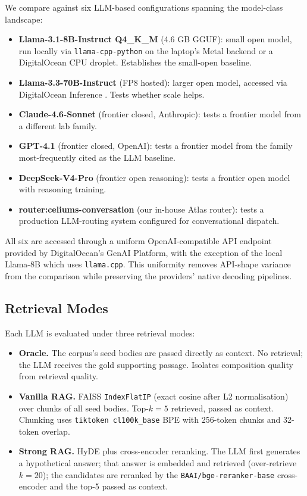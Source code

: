 We compare \hyphae{} against six LLM-based configurations
spanning the model-class landscape:

\begin{itemize}
    \item \textbf{Llama-3.1-8B-Instruct Q4\_K\_M} (4.6 GB GGUF):
    small open model, run locally via
    \texttt{llama-cpp-python} on the laptop's Metal backend or a
    DigitalOcean CPU droplet. Establishes the small-open
    baseline.
    \item \textbf{Llama-3.3-70B-Instruct} (FP8 hosted): larger
    open model, accessed via DigitalOcean Inference
    \citep{do_inference}. Tests whether scale helps.
    \item \textbf{Claude-4.6-Sonnet} (frontier closed,
    Anthropic): tests a frontier model from a different lab
    family.
    \item \textbf{GPT-4.1} (frontier closed, OpenAI): tests a
    frontier model from the family most-frequently cited as the
    LLM baseline.
    \item \textbf{DeepSeek-V4-Pro} (frontier open reasoning):
    tests a frontier open model with reasoning training.
    \item \textbf{router:celiums-conversation} (our in-house
    Atlas router): tests a production LLM-routing system
    configured for conversational dispatch.
\end{itemize}

All six are accessed through a uniform OpenAI-compatible API
endpoint provided by DigitalOcean's GenAI Platform, with the
exception of the local Llama-8B which uses \texttt{llama.cpp}.
This uniformity removes API-shape variance from the comparison
while preserving the providers' native decoding pipelines.

\subsection{Retrieval Modes}

Each LLM is evaluated under three retrieval modes:

\begin{itemize}
    \item \textbf{Oracle.} The corpus's seed bodies are passed
    directly as context. No retrieval; the LLM receives the gold
    supporting passage. Isolates composition quality from
    retrieval quality.
    \item \textbf{Vanilla RAG.} FAISS \citep{johnson2019faiss}
    \texttt{IndexFlatIP} (exact cosine after L2 normalisation)
    over chunks of all seed bodies. Top-$k=5$ retrieved, passed
    as context. Chunking uses \texttt{tiktoken cl100k\_base}
    BPE with 256-token chunks and 32-token overlap.
    \item \textbf{Strong RAG.} HyDE plus cross-encoder reranking.
    The LLM first generates a hypothetical answer; that answer is
    embedded and retrieved (over-retrieve $k=20$); the candidates
    are reranked by the \texttt{BAAI/bge-reranker-base}
    cross-encoder \citep{bge_reranker} and the top-5 passed as
    context.
\end{itemize}

